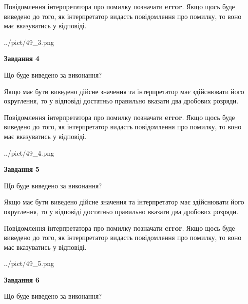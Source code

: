 \documentclass[12pt, ukrainian]{article}
\begin{document}
{\begin {Large}
Повідомлення інтерпретатора про помилку позначати \textbf{error}.
Якщо щось буде виведено до того, як інтерпретатор видасть повідомлення про помилку, 
то воно має вказуватись у відповіді. \par

\begin{center}
	{../pict/49_3.png}
\end{center}
\newpage

{\begin {center}\textbf{Завдання 4}\end {center}}\par
Що буде виведено за виконання? \par

Якщо має бути виведено дійсне значення та інтерпретатор має здійснювати його округлення, 
то у відповіді достатньо правильно вказати два дробових розряди.

Повідомлення інтерпретатора про помилку позначати \textbf{error}.
Якщо щось буде виведено до того, як інтерпретатор видасть повідомлення про помилку, 
то воно має вказуватись у відповіді. \par

\begin{center}
	{../pict/49_4.png}
\end{center}
\newpage

{\begin {center}\textbf{Завдання 5}\end {center}}\par
Що буде виведено за виконання? \par

Якщо має бути виведено дійсне значення та інтерпретатор має здійснювати його округлення, 
то у відповіді достатньо правильно вказати два дробових розряди.

Повідомлення інтерпретатора про помилку позначати \textbf{error}.
Якщо щось буде виведено до того, як інтерпретатор видасть повідомлення про помилку, 
то воно має вказуватись у відповіді. \par

\begin{center}
	{../pict/49_5.png}
\end{center}
\newpage

{\begin {center}\textbf{Завдання 6}\end {center}}\par
Що буде виведено за виконання? \par


\end{Large}}
\end{document}
